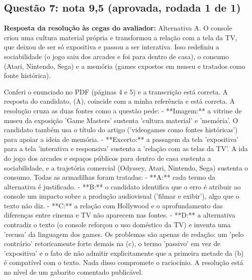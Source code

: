 \documentclass{article}%
\begin{document}
\subsection*{Questão 7: nota 9,5 (aprovada, rodada 1 de 1)}%
\textbf{Resposta da resolução às cegas do avaliador:} Alternativa A. O console criou uma cultura material própria e transformou a relação com a tela da TV, que deixou de ser só expositiva e passou a ser interativa. Isso redefiniu a sociabilidade (o jogo saiu dos arcades e foi para dentro de casa), o consumo (Atari, Nintendo, Sega) e a memória (games expostos em museu e tratados como fonte histórica).\par %
Conferi o enunciado no PDF (páginas 4 e 5) e a transcrição está correta. A resposta do candidato, (A), coincide com a minha referência e está correta.\newline%
\newline%
A resolução cruza as duas fontes como a questão pede:\newline%
{-} **Imagem:** a vitrine de museu da exposição 'Game Masters' sustenta 'cultura material' e 'memória'. O candidato também usa o título do artigo ('videogames como fontes históricas') para apoiar a ideia de memória.\newline%
{-} **Excerto:** a passagem da tela 'expositiva' para a tela 'interativa e responsiva' sustenta a 'relação com as telas da TV'. A ida do jogo dos arcades e espaços públicos para dentro de casa sustenta a sociabilidade, e a trajetória comercial (Odyssey, Atari, Nintendo, Sega) sustenta o consumo.\newline%
\newline%
Todas as armadilhas foram tratadas:\newline%
{-} **A:** cada termo da alternativa é justificado.\newline%
{-} **B:** o candidato identifica que o erro é atribuir ao console um impacto sobre a produção audiovisual ('filmar e exibir'), algo que o texto não diz.\newline%
{-} **C:** a relação com Hollywood e o aprofundamento das diferenças entre cinema e TV não aparecem nas fontes.\newline%
{-} **D:** a alternativa contradiz o texto (o console reforçou o uso doméstico da TV) e inventa uma 'recusa' da linguagem dos games.\newline%
\newline%
Os problemas são apenas de redação: um 'pelo contrário' retoricamente forte demais na (c), o termo 'passivo' em vez de 'expositiva' e o fato de não admitir explicitamente que a primeira metade da (b) é compatível com o texto. Nada disso compromete o raciocínio. A resolução está no nível de um gabarito comentado publicável.%
\end{document}

